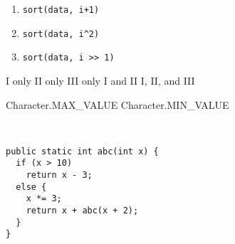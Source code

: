 \documentclass[11pt,addpoints]{exam}
\begin{document}
\begin{questions}
\begin{minipage}{\textwidth}
\begin{enumerate}[label=\Roman*.]
  \item {\tt sort(data, i+1)}
  \item {\tt sort(data, i\textasciicircum2)}
  \item {\tt sort(data, i >> 1)}
\end{enumerate}

\begin{choices}
  \choice I only
  \choice II only
  \choice III only
  \choice I and II
  \choice I, II, and III \\
\end{choices}

\end{minipage}


\begin{minipage}{\textwidth}

\begin{choices}
  \choice Character.MAX\_VALUE
  \choice Character.MIN\_VALUE
   \\ 
\end{choices}
\end{minipage}

\begin{minipage}{\textwidth}

\begin{choices}
   \\
\end{choices}
\end{minipage}

\begin{minipage}{\textwidth}



\begin{verbatim}
public static int abc(int x) {
  if (x > 10)
    return x - 3;
  else {
    x *= 3;
    return x + abc(x + 2);
  }
}
\end{verbatim}


\end{minipage}
\end{questions}
\end{document}
